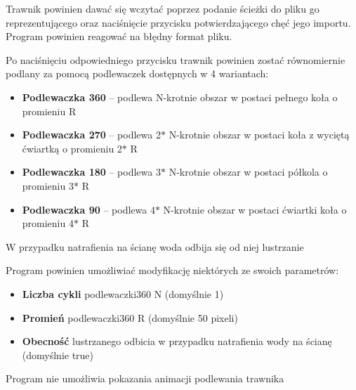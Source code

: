 \documentclass[12pt]{article}
\renewcommand{\_}{\kern-1.5pt\textunderscore\kern-1.5pt}
\begin{document}
\begin{enumerate}
Trawnik powinien dawać się wczytać poprzez podanie ścieżki do pliku go reprezentującego oraz naciśnięcie przycisku potwierdzającego chęć jego importu. Program powinien reagować na błędny format pliku.\par

Po naciśnięciu odpowiedniego przycisku trawnik powinien zostać równomiernie podlany za pomocą podlewaczek dostępnych w 4 wariantach:\par

\begin{itemize}
	\item \textbf{Podlewaczka 360} – podlewa N-krotnie obszar w postaci pełnego koła o promieniu R\par

	\item \textbf{Podlewaczka 270} – podlewa 2$\ast$ N-krotnie obszar w postaci koła z wyciętą ćwiartką o promieniu 2$\ast$ R\par

	\item \textbf{Podlewaczka 180 }– podlewa 3$\ast$ N-krotnie obszar w postaci półkola o promieniu 3$\ast$ R\par

	\item \textbf{Podlewaczka 90} – podlewa 4$\ast$ N-krotnie obszar w postaci ćwiartki koła o promieniu 4$\ast$ R
\end{itemize}\par

W przypadku natrafienia na ścianę woda odbija się od niej lustrzanie\par

Program powinien umożliwiać modyfikację niektórych ze swoich parametrów:\par

\begin{itemize}
	\item \textbf{Liczba cykli} podlewaczki360 N (domyślnie 1) \par

	\item \textbf{Promień} podlewaczki360 R (domyślnie 50 pixeli)\par

	\item \textbf{Obecność} lustrzanego odbicia w przypadku natrafienia wody na ścianę (domyślnie true)
\end{itemize}\par

Program nie umożliwia pokazania animacji podlewania trawnika\par



\end{enumerate}
\end{document}
